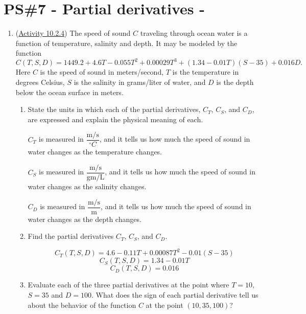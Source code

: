 


%


\allowdisplaybreaks
\section{PS\#7 - Partial derivatives -  }

\begin{enumerate}[leftmargin=0pt]
\item (\href{https://activecalculus.org/multi/S-10-2-First-Order-Partial-Derivatives.html#A_10_2_11}{Activity 10.2.4}) The speed of sound $C$ traveling through ocean water is a function of temperature, salinity and depth. It may be modeled by the function
\begin{equation*}
C(T,S, D)=1449.2+4.6T-0.055T^2+0.00029T^3+(1.34-0.01T)(S-35)+0.016D.
\end{equation*}
Here $C$ is the speed of sound in meters/second, $T$ is the temperature in degrees Celsius, $S$ is the salinity in grams/liter of water, and $D$ is the depth below the ocean surface in meters.
\begin{enumerate}
    \item State the units in which each of the partial derivatives, $C_T$, $C_S$, and $C_D$, are expressed and explain the physical meaning of each.
    
    \begin{red}
    $C_T$ is measured in $\dfrac{\textrm{m/s}}{^\circ C}$, and it tells us how much the speed of sound in water changes as the temperature changes.
    
    $C_S$ is measured in $\dfrac{\textrm{m/s}}{\textrm{gm/L}}$, and it tells us how much the speed of sound in water changes as the salinity changes.
    
    $C_D$ is measured in $\dfrac{\textrm{m/s}}{\textrm{m}}$, and it tells us how much the speed of sound in water changes as the depth changes.
    \end{red}
    \item Find the partial derivatives $C_T$, $C_S$, and $C_D$. 
    
    \begin{red}
    \[C_T(T,S, D) = 4.6 - 0.11 T + 0.00087 T^2 -0.01(S-35) \]
    \[C_S(T,S, D) = 1.34-0.01T \]
    \[C_D(T,S, D) = 0.016\]
    \end{red}
    \item Evaluate each of the three partial derivatives at the point where $T=10$, $S=35$ and $D=100$. What does the sign of each partial derivative tell us about the behavior of the function $C$ at the point $(10, 35, 100)$?
    

\end{enumerate}
\end{enumerate}
